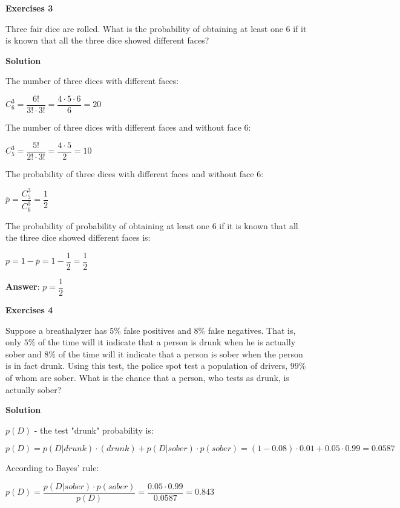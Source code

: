 \documentclass[12pt]{article}
\theoremstyle{definiton}
\theoremstyle{definition}
\theoremstyle{definition}
\begin{document}
		\textbf{Exercises 3}
		
		Three fair dice are rolled. What is the probability of obtaining at least one 6 if it is known that all the three dice showed different faces?

		\medskip
		
		\textbf{Solution}
		
		The number of three dices with different faces: 
		
		$C^3_6=\dfrac{6!}{3!\cdot3!}=\dfrac{4\cdot5\cdot6}{6}=20$
		
		The number of three dices with different faces and without face 6:
		
		$C^3_5=\dfrac{5!}{2!\cdot3!}=\dfrac{4\cdot5}{2}=10$
		
		The probability of three dices with different faces and without face 6:
		
		$\overline{p} = \dfrac{C^3_5}{C^3_6}=\dfrac{1}{2}$
		
		The probability of probability of obtaining at least one 6 if it is known that all the three dice showed different faces is:
		
		$p = 1-\overline{p} = 1 - \dfrac{1}{2} = \dfrac{1}{2}$
		
		\medskip
		\textbf{Answer}: $p = \dfrac{1}{2}$
		
		\bigskip
		
		\textbf{Exercises 4}
		
Suppose a breathalyzer has $5\%$  false positives and $8\%$ false negatives. That is, only $5\%$ of the time will it indicate that a person is drunk when he is actually sober and $8\%$ of the time will it indicate that a person is sober when the person is in fact drunk. Using this test, the police spot test a population of drivers, $99\%$ of whom are sober.
What is the chance that a person, who tests as drunk, is actually sober?

		\medskip
		
		\textbf{Solution}

		$p\left(D\right)$ - the test "drunk" probability is:
		
		$p\left(D\right) = p\left(D|drunk\right)\cdotp\left(drunk\right)+p\left(D|sober\right)\cdot p\left(sober\right) = \left(1-0.08\right)\cdot 0.01+0.05\cdot 0.99 = 0.0587$
		
		According to Bayes' rule:
		
		$p\left(D\right)=\dfrac{p(D|sober)\cdot p\left(sober\right)}{p\left(D\right)}=\dfrac{0.05\cdot 0.99}{0.0587}=0.843$
		
\end{document}
